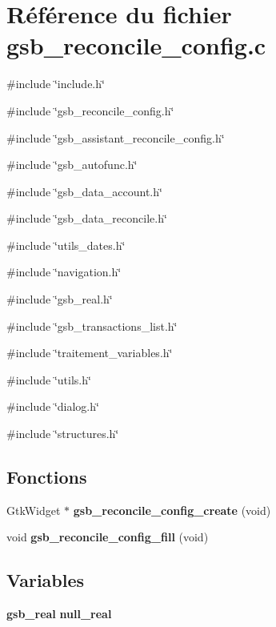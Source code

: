 \section{Référence du fichier gsb\_\-reconcile\_\-config.c}
\label{gsb__reconcile__config_8c}
{\ttfamily \#include \char`\"{}include.h\char`\"{}}\par
{\ttfamily \#include \char`\"{}gsb\_\-reconcile\_\-config.h\char`\"{}}\par
{\ttfamily \#include \char`\"{}gsb\_\-assistant\_\-reconcile\_\-config.h\char`\"{}}\par
{\ttfamily \#include \char`\"{}gsb\_\-autofunc.h\char`\"{}}\par
{\ttfamily \#include \char`\"{}gsb\_\-data\_\-account.h\char`\"{}}\par
{\ttfamily \#include \char`\"{}gsb\_\-data\_\-reconcile.h\char`\"{}}\par
{\ttfamily \#include \char`\"{}utils\_\-dates.h\char`\"{}}\par
{\ttfamily \#include \char`\"{}navigation.h\char`\"{}}\par
{\ttfamily \#include \char`\"{}gsb\_\-real.h\char`\"{}}\par
{\ttfamily \#include \char`\"{}gsb\_\-transactions\_\-list.h\char`\"{}}\par
{\ttfamily \#include \char`\"{}traitement\_\-variables.h\char`\"{}}\par
{\ttfamily \#include \char`\"{}utils.h\char`\"{}}\par
{\ttfamily \#include \char`\"{}dialog.h\char`\"{}}\par
{\ttfamily \#include \char`\"{}structures.h\char`\"{}}\par
\subsection*{Fonctions}
\begin{DoxyCompactItemize}
\item 
GtkWidget $\ast$ {\bf gsb\_\-reconcile\_\-config\_\-create} (void)
\item 
void {\bf gsb\_\-reconcile\_\-config\_\-fill} (void)
\end{DoxyCompactItemize}
\subsection*{Variables}
\begin{DoxyCompactItemize}
\item 
{\bf gsb\_\-real} {\bf null\_\-real}
\end{DoxyCompactItemize}


